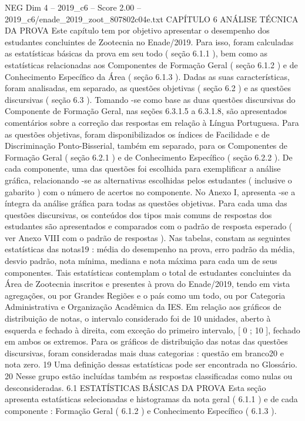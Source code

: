 \begin{textsample}{NEG Dim 4 – 2019\_c6 – Score 2.00 – 2019\_c6/enade\_2019\_zoot\_807802c04e.txt}  \label{ex:f4_neg_267}
CAPÍTULO 6 ANÁLISE TÉCNICA DA PROVA Este capítulo tem por objetivo apresentar o desempenho dos estudantes concluintes de Zootecnia no Enade/2019.
Para isso, foram calculadas as estatísticas básicas da prova em seu todo ( seção 6.1.1 ), bem como as estatísticas relacionadas aos Componentes de Formação Geral ( seção 6.1.2 ) e de Conhecimento Específico da Área ( seção 6.1.3 ).
Dadas as suas características, foram analisadas, em separado, as questões objetivas ( seção 6.2 ) e as questões discursivas ( seção 6.3 ).
Tomando -se como base as duas questões discursivas do Componente de Formação Geral, nas seções 6.3.1.5 a 6.3.1.8, são apresentados comentários sobre a correção das respostas em relação à Língua Portuguesa.
Para as questões objetivas, foram disponibilizados os índices de Facilidade e de Discriminação Ponto-Bisserial, também em separado, para os Componentes de Formação Geral ( seção 6.2.1 ) e de Conhecimento Específico ( seção 6.2.2 ).
De cada componente, uma das questões foi escolhida para exemplificar a análise gráfica, relacionando -se as alternativas escolhidas pelos estudantes ( inclusive o gabarito ) com o número de acertos no componente.
No Anexo I, apresenta -se a íntegra da análise gráfica para todas as questões objetivas.
Para cada uma das questões discursivas, os conteúdos dos tipos mais comuns de respostas dos estudantes são apresentados e comparados com o padrão de resposta esperado ( ver Anexo VIII com o padrão de respostas ).
Nas tabelas, constam as seguintes estatísticas das notas19 : média do desempenho na prova, erro padrão da média, desvio padrão, nota mínima, mediana e nota máxima para cada um de seus componentes.
Tais estatísticas contemplam o total de estudantes concluintes da Área de Zootecnia inscritos e presentes à prova do Enade/2019, tendo em vista agregações, ou por Grandes Regiões e o país como um todo, ou por Categoria Administrativa e Organização Acadêmica da IES.
Em relação aos gráficos de distribuição de notas, o intervalo considerado foi de 10 unidades, aberto à esquerda e fechado à direita, com exceção do primeiro intervalo, [ 0 ; 10 ], fechado em ambos os extremos.
Para os gráficos de distribuição das notas das questões discursivas, foram consideradas mais duas categorias : questão em branco20 e nota zero. 19 Uma definição dessas estatísticas pode ser encontrada no Glossário. 20 Nesse grupo estão incluídas também as respostas classificadas como nulas ou desconsideradas. 6.1 ESTATÍSTICAS BÁSICAS DA PROVA Esta seção apresenta estatísticas selecionadas e histogramas da nota geral ( 6.1.1 ) e de cada componente : Formação Geral ( 6.1.2 ) e Conhecimento Específico ( 6.1.3 ).

\end{textsample}
